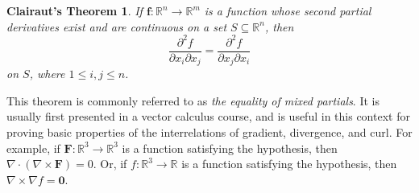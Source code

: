\documentclass[12pt]{article}
\newtheorem*{cthm*}{Clairaut's Theorem}
\begin{document}
\begin{cthm*}
If $\mathbf{f}\colon\mathbb{R}^n \to \mathbb{R}^m$ is a function whose second partial derivatives exist and are continuous on a set $S \subseteq \mathbb{R}^n$, then
\[
   \frac{\partial^2 f}{\partial x_i \partial x_j}
  =\frac{\partial^2 f}{\partial x_j \partial x_i}
\]
on $S$, where $1 \leq i,j \leq n$.
\end{cthm*}

This theorem is commonly referred to as \emph{the equality of mixed partials}.
It is usually first presented in a vector calculus course,
and is useful in this context for proving basic properties of the interrelations of gradient, divergence, and curl.
For example, if $\mathbf{F}\colon \mathbb{R}^3 \to \mathbb{R}^3$ is a function satisfying the hypothesis, then $\nabla \cdot (\nabla \times \mathbf{F}) =0$.
Or, if $f\colon\mathbb{R}^3 \to \mathbb{R}$ is a function satisfying the hypothesis, then $\nabla \times \nabla f= \mathbf{0}$.
\end{document}
